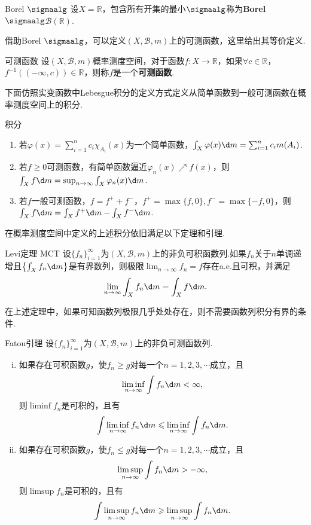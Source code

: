 \begin{definition}{Borel $\sigmaalg$}
    设$X=\mathbb{R}$，包含所有开集的最小$\sigmaalg$称为\textbf{Borel $\sigmaalg$$\mathcal{B}(\mathbb{R})$}.
\end{definition}

借助Borel $\sigmaalg$，可以定义$(X,\mathcal{B},m)$上的可测函数，这里给出其等价定义.
\begin{definition}{可测函数}
    设$(X,\mathcal{B},m)$概率测度空间，对于函数$f:X\to\mathbb{R}$，如果$\forall c \in \mathbb{R}$，$f^{-1}\left((-\infty,c)\right) \in \mathbb{R}$，则称$f$是一个\textbf{可测函数}.
\end{definition}

下面仿照实变函数中Lebesgue积分的定义方式定义从简单函数到一般可测函数在概率测度空间上的积分.

\begin{definition}{积分}
    \wideline
    \begin{enumerate}
        \item 若$\varphi(x) = \sum_{i=1}^n{c_i \chi_{A_i}(x)}$为一个简单函数，$\int_X{\varphi(x)}\d m = \sum_{i=1}^n{c_i m(A_i)}$.
        \item 若$f\geqslant 0$可测函数，有简单函数逼近$\varphi_n(x) \nearrow f(x)$，则$\int_X{f}\d m=\sup_{n\to\infty}\int_X{\varphi_n(x)\d m}$.
        \item 若$f$一般可测函数，$f=f^++f^-$，$f^+=\max\{f,0\}, f^-=\max\{-f,0\}$，则$\int_X{f}\d m = \int_X{f^+}\d m - \int_X{f^-}\d m$.
    \end{enumerate}
\end{definition}

在概率测度空间中定义的上述积分依旧满足以下定理和引理.

\begin{theorem}{Levi定理 MCT}
    设$\{f_n\}_{i=1}^\infty$为$(X,\mathcal{B},m)$上的非负可积函数列.如果$f_n$关于$n$单调递增且$\left\{ \int_X{f_n}\d m \right\}$是有界数列，则极限$\lim_{n\to\infty}{f_n} = f$存在a.e.且可积，并满足
    \[\lim_{n\to\infty}{\int_X{f_n}\d m}=\int_{X}{f}\d m.\]
\end{theorem}
\begin{remark}
    在上述定理中，如果可知函数列极限几乎处处存在，则不需要函数列积分有界的条件.
\end{remark}

\begin{lemma}{Fatou引理}
    设$\{f_n\}_{i=1}^\infty$为$(X,\mathcal{B},m)$上的非负可测函数列.
    \begin{enumerate}[(i)]
        \item 如果存在可积函数$g$，使$f_n \geqslant g$对每一个$n=1,2,3,\cdots$成立，且
        \[ \liminf_{n\to\infty}{\int{f_n}}\d m <\infty, \]
        则$\liminf{f_n}$是可积的，且有
        \[\int{\liminf_{n\to\infty}{f_n}\d m} \leqslant \liminf_{n\to\infty}{\int{f_n}\d m}. \]
        \item 如果存在可积函数$g$，使$f_n \leqslant g$对每一个$n=1,2,3,\cdots$成立，且
        \[ \limsup_{n\to\infty}{\int{f_n}}\d m > -\infty, \]
        则$\limsup{f_n}$是可积的，且有
        \[\int{\limsup_{n\to\infty}{f_n}\d m} \geqslant \limsup_{n\to\infty}{\int{f_n}\d m}. \]
    \end{enumerate}
\end{lemma}

